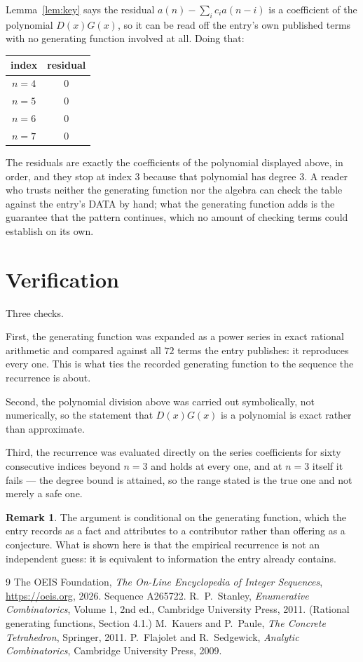 \documentclass[11pt,a4paper]{article}
\theoremstyle{plain}
\theoremstyle{definition}
\newtheorem{remark}[theorem]{Remark}
\begin{document}
Lemma~\ref{lem:key} says the residual $a(n)-\sum_ic_ia(n-i)$ is a coefficient of the
polynomial $D(x)G(x)$, so it can be read off the entry's own published terms with no
generating function involved at all. Doing that:
\begin{center}
\begin{tabular}{cc}
index & residual \\ \hline
$n=4$ & $0$ \\
$n=5$ & $0$ \\
$n=6$ & $0$ \\
$n=7$ & $0$
\end{tabular}
\end{center}
The residuals are exactly the coefficients of the polynomial displayed above, in order, and
they stop at index $3$ because that polynomial has degree $3$. A reader who trusts
neither the generating function nor the algebra can check the table against the entry's DATA
by hand; what the generating function adds is the guarantee that the pattern continues, which
no amount of checking terms could establish on its own.

\section{Verification}

Three checks.

First, the generating function was expanded as a power series in exact rational arithmetic and
compared against all $72$ terms the entry publishes: it reproduces every one. This is
what ties the recorded generating function to the sequence the recurrence is about.

Second, the polynomial division above was carried out symbolically, not numerically, so the
statement that $D(x)G(x)$ is a polynomial is exact rather than approximate.

Third, the recurrence was evaluated directly on the series coefficients for sixty consecutive
indices beyond $n=3$ and holds at every one, and at $n=3$ itself it fails --- the
degree bound is attained, so the range stated is the true one and not merely a safe one.

\begin{remark}
The argument is conditional on the generating function, which the entry records as a fact and
attributes to a contributor rather than offering as a conjecture. What is shown here is that
the empirical recurrence is not an independent guess: it is equivalent to information the
entry already contains.
\end{remark}

\begin{thebibliography}{9}
 The OEIS Foundation, \emph{The On-Line Encyclopedia of Integer
Sequences}, \url{https://oeis.org}, 2026. Sequence A265722.
 R.~P.~Stanley, \emph{Enumerative Combinatorics}, Volume 1, 2nd ed.,
Cambridge University Press, 2011. (Rational generating functions, Section 4.1.)
 M.~Kauers and P.~Paule, \emph{The Concrete Tetrahedron}, Springer, 2011.
 P.~Flajolet and R.~Sedgewick, \emph{Analytic Combinatorics}, Cambridge
University Press, 2009.
\end{thebibliography}
\end{document}
